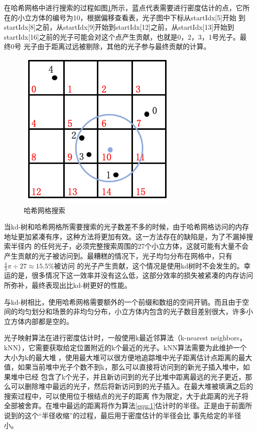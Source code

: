 \documentclass[UTF8]{ctexart}
\begin{document}
        在哈希网格中进行搜索的过程如图\ref{fig:2}所示，蓝点代表需要进行密度估计的点，它所在的小立方体的编号为10，根据偏移查看表，光子图中下标从startIdx[5]开始
        到startIdx[8]之前，从startIdx[9]开始到startIdx[12]之前，从startIdx[13]开始到startIdx[16]之前的光子可能会对这个点产生贡献，也就是0，2，3，1号光子。最终0号
        光子由于距离过远被剔除，其他的光子参与最终贡献的计算。
        
        \begin{figure}[H]
        \centering
        \includegraphics[scale=0.6]{pic/HashGridSearch.png}
        \caption{哈希网格搜索}
        \label{fig:2}
        \end{figure}
        
        当kd-树和哈希网格所需要搜索的光子数差不多的时候，由于哈希网格访问的内存地址更加紧凑有序，这种方法将更加有效。这一方法存在的缺陷是，为了不漏掉搜索半径内
        的任何光子，必须完整搜索周围的27个小立方体，这就可能有大量不会产生贡献的光子被访问到。最糟糕的情况下，光子均匀分布在网格中，只有$\frac{4}{3}\pi\div27\approx15.5\%$被访问
        的光子产生贡献，这个情况是使用kd树时不会发生的。幸运的是，很多情况下这一效率并没有这么低，这部分效率的损失被紧凑的内存访问所弥补，最终表现出比kd-树更好的性能。
        
        与kd-树相比，使用哈希网格需要额外的一个前缀和数组的空间开销。而且由于空间的均匀划分和场景的非均匀分布，小立方体内包含的光子数目差别很大，许多小立方体内部都是空的。
        
        光子映射算法在进行密度估计时，一般使用k最近邻算法（k-nearest neighbors，kNN），它需要获取给定位置附近的k个最近的光子。kNN算法需要为此维护一个大小为k的最大堆
        \cite{jensen2000practical}，使用最大堆可以很方便地追踪堆中光子距离估计点距离的最大值，如果当前堆中光子个数不到k，那么可以直接将访问到的新光子插入堆中，如果堆中已经
        包含了k个光子，并且新访问到的光子比堆中距离最远的光子更近，那么可以删除堆中最远的光子，然后将新访问到的光子插入。在最大堆被填满之后的搜索过程中，可以使用位于根结点的光子的距离
        作为限定，大于此距离的光子将全部被舍弃。在堆中最远的距离将作为算法\ref{equ:1}估计时的半径。正是由于前面所说到的这个“半径收缩”的过程，最后用于密度估计的半径会比
        事先给定的半径小\cite{2003Photon}。
        
\end{document}
